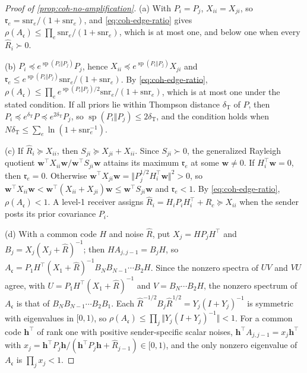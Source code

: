 \begin{proof}[Proof of \cref{prop:coh-no-amplification}]
(a) With $P_i=P_j$, $X_{ii}=X_{ji}$, so $\mathfrak r_e=\mathrm{snr}_e/(1+\mathrm{snr}_e)$, and \eqref{eq:coh-edge-ratio} gives $\rho(A_{\mathfrak c})\le\prod_e\mathrm{snr}_e/(1+\mathrm{snr}_e)$, which is at most one, and below one when every $\hat R_i\succ0$.

(b) $P_i\preceq e^{\operatorname{sp}(P_i\Vert P_j)}P_j$, hence $X_{ii}\preceq e^{\operatorname{sp}(P_i\Vert P_j)}X_{ji}$ and $\mathfrak r_e\le e^{\operatorname{sp}(P_i\Vert P_j)}\mathrm{snr}_e/(1+\mathrm{snr}_e)$. By \eqref{eq:coh-edge-ratio}, $\rho(A_{\mathfrak c})\le\prod_ee^{\operatorname{sp}(P_i\Vert P_j)/2}\mathrm{snr}_e/(1+\mathrm{snr}_e)$, which is at most one under the stated condition. If all priors lie within Thompson distance $\delta_{\mathrm T}$ of $P$, then $P_i\preceq e^{\delta_{\mathrm T}}P\preceq e^{2\delta_{\mathrm T}}P_j$, so $\operatorname{sp}(P_i\Vert P_j)\le2\delta_{\mathrm T}$, and the condition holds when $N\delta_{\mathrm T}\le\sum_e\ln(1+\mathrm{snr}_e^{-1})$.

(c) If $\hat R_i\succeq X_{ii}$, then $S_{ji}\succeq X_{ji}+X_{ii}$. Since $S_{ji}\succ0$, the generalized Rayleigh quotient $\bm w^\top X_{ii}\bm w/\bm w^\top S_{ji}\bm w$ attains its maximum $\mathfrak r_e$ at some $\bm w\ne0$. If $H_i^\top\bm w=0$, then $\mathfrak r_e=0$. Otherwise $\bm w^\top X_{ji}\bm w=\Vert P_j^{1/2}H_i^\top\bm w\Vert^2>0$, so $\bm w^\top X_{ii}\bm w<\bm w^\top(X_{ii}+X_{ji})\bm w\le\bm w^\top S_{ji}\bm w$ and $\mathfrak r_e<1$. By \eqref{eq:coh-edge-ratio}, $\rho(A_{\mathfrak c})<1$. A level-1 receiver assigns $\hat R_i=H_iP_iH_i^\top+R_c\succeq X_{ii}$ when the sender posts its prior covariance $P_i$.

(d) With a common code $H$ and noise $\hat R$, put $X_j=HP_jH^\top$ and $B_j=X_j(X_j+\hat R)^{-1}$; then $HA_{j,j-1}=B_jH$, so $A_{\mathfrak c}=P_1H^\top(X_1+\hat R)^{-1}B_NB_{N-1}\cdots B_2H$. Since the nonzero spectra of $UV$ and $VU$ agree, with $U=P_1H^\top(X_1+\hat R)^{-1}$ and $V=B_N\cdots B_2H$, the nonzero spectrum of $A_{\mathfrak c}$ is that of $B_NB_{N-1}\cdots B_2B_1$. Each $\hat R^{-1/2}B_j\hat R^{1/2}=Y_j(I+Y_j)^{-1}$ is symmetric with eigenvalues in $[0,1)$, so $\rho(A_{\mathfrak c})\le\prod_j\Vert Y_j(I+Y_j)^{-1}\Vert<1$. For a common code $\bm h^\top$ of rank one with positive sender-specific scalar noises, $\bm h^\top A_{j,j-1}=x_j\bm h^\top$ with $x_j=\bm h^\top P_j\bm h/(\bm h^\top P_j\bm h+\hat R_{j-1})\in[0,1)$, and the only nonzero eigenvalue of $A_{\mathfrak c}$ is $\prod_jx_j<1$.
\end{proof}

